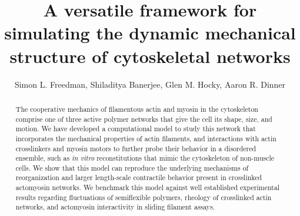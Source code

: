 \documentclass[12pt]{article}
\begin{document}
\title{A versatile framework for simulating the dynamic mechanical structure of cytoskeletal networks}
\author{Simon L. Freedman, Shiladitya Banerjee, Glen M. Hocky, Aaron R. Dinner}
\date{}
\maketitle
\begin{abstract} 
  The cooperative mechanics of filamentous actin and myosin in the cytoskeleton comprise one of three active polymer
  networks that give the cell its shape, size, and motion. We have developed a computational model to study this network that incorporates 
  the mechanical properties of actin filaments, and interactions with actin crosslinkers and myosin motors to further
  probe their behavior in a disordered ensemble, such as {\em in vitro} reconstitutions that mimic the cytoskeleton of non-muscle cells. 
  We show that this model can reproduce the underlying mechanisms of reorganization
  and larger length-scale contractile behavior present in crosslinked actomyosin networks.
  We benchmark this model against well established experimental results regarding fluctuations of
  semiflexible polymers, rheology of crosslinked actin networks, and actomyosin interactivity in sliding filament assays. 
\end{abstract}
\end{document}
